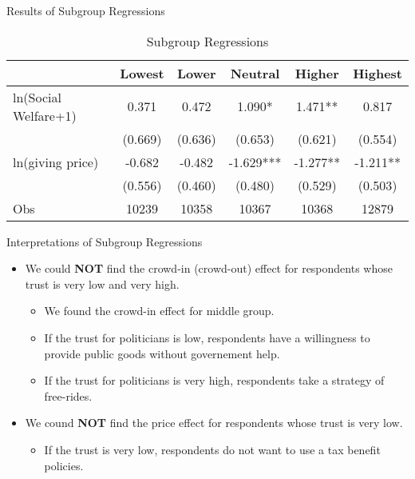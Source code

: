 \documentclass[
  ignorenonframetext,
]{beamer}
\providecommand{\tightlist}{%
  \setlength{\itemsep}{0pt}\setlength{\parskip}{0pt}}
\begin{document}
\begin{frame}{Results of Subgroup Regressions}
\protect\hypertarget{results-of-subgroup-regressions}{}
\begin{table}

\caption{\label{tab:kableTabTrustGroupReg}Subgroup Regressions}
\centering
\fontsize{9}{11}\selectfont
\begin{tabular}[t]{lccccc}
\toprule
 & Lowest & Lower & Neutral & Higher & Highest\\
\midrule
ln(Social Welfare+1) & 0.371 & 0.472 & 1.090* & 1.471** & 0.817\\
 & (0.669) & (0.636) & (0.653) & (0.621) & (0.554)\\
ln(giving price) & -0.682 & -0.482 & -1.629*** & -1.277** & -1.211**\\
 & (0.556) & (0.460) & (0.480) & (0.529) & (0.503)\\
Obs & 10239 & 10358 & 10367 & 10368 & 12879\\
\bottomrule
\end{tabular}
\end{table}
\end{frame}

\begin{frame}{Interpretations of Subgroup Regressions}
\protect\hypertarget{interpretations-of-subgroup-regressions}{}
\begin{itemize}
\tightlist
\item
  We could \textbf{NOT} find the crowd-in (crowd-out) effect for
  respondents whose trust is very low and very high.

  \begin{itemize}
  \tightlist
  \item
    We found the crowd-in effect for middle group.
  \item
    If the trust for politicians is low, respondents have a willingness
    to provide public goods without governement help.
  \item
    If the trust for politicians is very high, respondents take a
    strategy of free-rides.
  \end{itemize}
\item
  We cound \textbf{NOT} find the price effect for respondents whose
  trust is very low.

  \begin{itemize}
  \tightlist
  \item
    If the trust is very low, respondents do not want to use a tax
    benefit policies.
  \end{itemize}
\end{itemize}
\end{frame}
\end{document}
